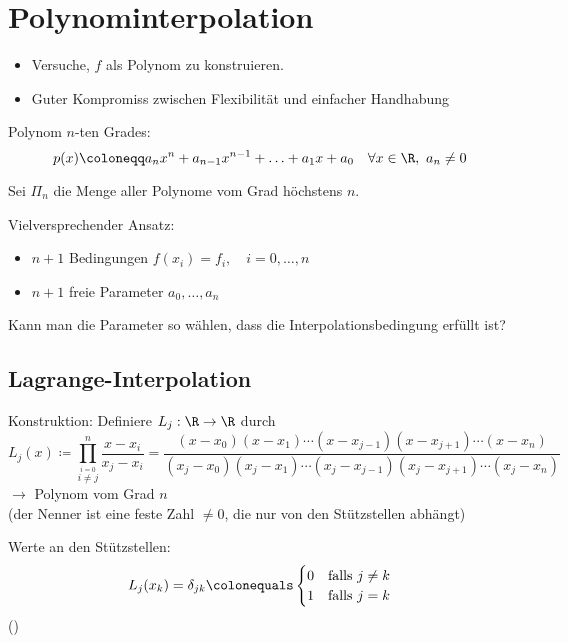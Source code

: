 \section{Polynominterpolation}

\begin{itemize}
 \item Versuche, $f$ als Polynom zu konstruieren.
 \item Guter Kompromiss zwischen Flexibilität und einfacher Handhabung
\end{itemize}

Polynom $n$-ten Grades:
\begin{equation*}
    p(x) \coloneqq a_n x^n + a_{n-1}x^{n-1} + \hdots + a_1 x + a_0\quad \forall x\in\R,\ a_n\neq 0
\end{equation*}

Sei $\Pi_n$ die Menge aller Polynome vom Grad höchstens $n$.

\bigskip

Vielversprechender Ansatz:
\begin{itemize}
  \item $n+1$ Bedingungen $f(x_i)=f_i,\quad i=0,\hdots,n$
  \item $n+1$ freie Parameter $a_0,\hdots,a_n$
\end{itemize}

Kann man die Parameter so wählen, dass die Interpolationsbedingung erfüllt ist?\\

\subsection{Lagrange-Interpolation}

Konstruktion: Definiere $L_j : \R\to\R$ durch
\begin{equation*}
 L_j(x)\coloneqq \prod_{\stackrel{i=0}{i\neq j}}^n \frac{x-x_i}{x_j-x_i} = \frac{(x-x_0)(x-x_1) \cdots (x-x_{j-1})(x-x_{j+1}) \cdots (x-x_n)}{(x_j-x_0)(x_j-x_1) \cdots (x_j-x_{j-1})(x_j-x_{j+1}) \cdots (x_j-x_n)}
\end{equation*}
$\rightarrow$ Polynom vom Grad $n$\\ (der Nenner ist eine feste Zahl $\neq 0$, die nur von den Stützstellen abhängt)

\medskip

Werte an den Stützstellen:
\begin{equation*}
 L_j(x_k)
 =
 \delta_{jk}
 \colonequals
 \begin{cases}
  0 & \text{falls $j\neq k$} \\
  1 & \text{falls $j=k$}
 \end{cases}
\end{equation*}
()\\

